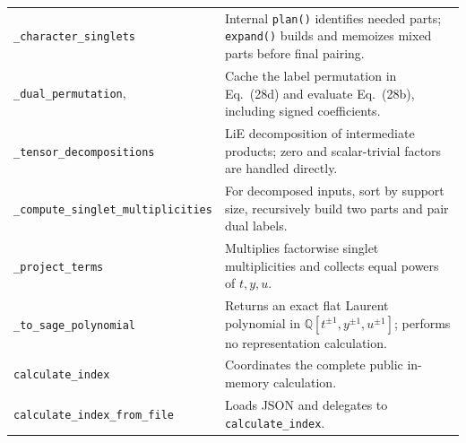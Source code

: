 \documentclass[11pt,a4paper]{article}
\newcommand{\code}[1]{{\small\nolinkurl{#1}}}
\begin{document}
\begin{tabularx}{\textwidth}{@{}p{65mm}Y@{}}
\code{_character_singlets} & Internal \code{plan()} identifies needed parts;
\code{expand()} builds and memoizes mixed parts before final pairing.\\
\code{_dual_permutation},\newline\code{_singlet_pair} & Cache the label permutation
in Eq.~(28d) and evaluate Eq.~(28b), including signed coefficients.\\
\code{_tensor_decompositions} & LiE decomposition of intermediate products;
zero and scalar-trivial factors are handled directly.\\
\code{_compute_singlet_multiplicities} & For decomposed inputs, sort by support
size, recursively build two parts and pair dual labels.\\
\code{_project_terms} & Multiplies factorwise singlet multiplicities and collects
equal powers of $t,y,u$.\\
\code{_to_sage_polynomial} & Returns an exact flat Laurent polynomial in
$\mathbb Q[t^{\pm1},y^{\pm1},u^{\pm1}]$; performs no representation calculation.\\
\code{calculate_index} & Coordinates the complete public in-memory calculation.\\
\code{calculate_index_from_file} & Loads JSON and delegates to \code{calculate_index}.\\\bottomrule
\end{tabularx}

\clearpage
\end{document}
